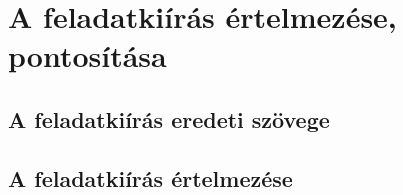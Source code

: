 \chapter{A feladatkiírás értelmezése, pontosítása}

\section{A feladatkiírás eredeti szövege}

\section{A feladatkiírás értelmezése}
